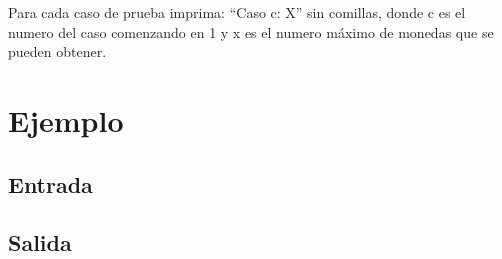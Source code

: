 \documentclass[11pt,letterpaper]{article}
\begin{document}
Para cada caso de prueba imprima: ``Caso c: X'' sin comillas, donde c es el numero del caso comenzando en 1 y x es el numero máximo de monedas que se pueden obtener.

\section{Ejemplo}
\subsection{Entrada}

\subsection{Salida}


%
%
\end{document}
